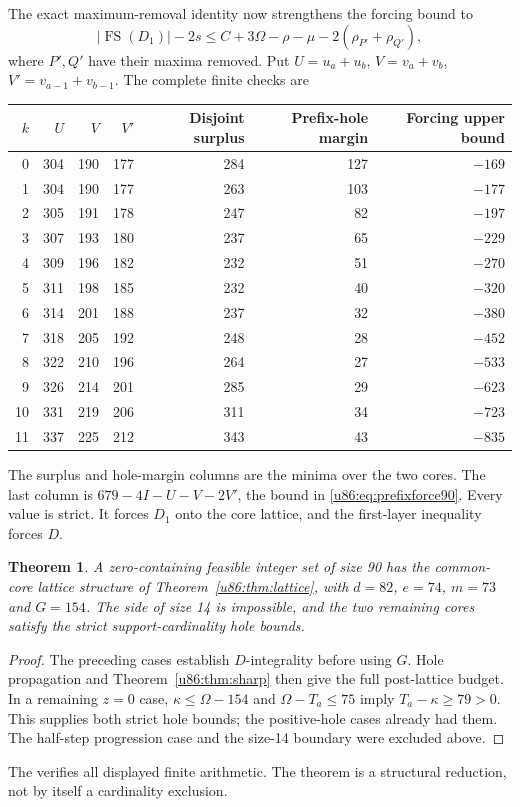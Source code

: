 \documentclass[11pt,a4paper]{article}
\newtheorem{theorem}{Theorem}[section]
\theoremstyle{remark}
\newcommand{\FS}{\operatorname{FS}}
\begin{document}
The exact maximum-removal identity now strengthens the forcing bound to
\begin{equation}\label{u86:eq:prefixforce90}
 |\FS(D_1)|-2s
 \le C+3\Omega-\rho-\mu-2(\rho_{P'}+\rho_{Q'}),
\end{equation}
where $P',Q'$ have their maxima removed. Put
$U=u_a+u_b$, $V=v_a+v_b$, $V'=v_{a-1}+v_{b-1}$.
The complete finite checks are
\begin{center}\small
\begin{tabular}{r|rrrrrr}
\toprule
$k$&$U$&$V$&$V'$&Disjoint surplus&Prefix-hole margin&Forcing upper bound\\\midrule
0&304&190&177&284&127&$-169$\\
1&304&190&177&263&103&$-177$\\
2&305&191&178&247&82&$-197$\\
3&307&193&180&237&65&$-229$\\
4&309&196&182&232&51&$-270$\\
5&311&198&185&232&40&$-320$\\
6&314&201&188&237&32&$-380$\\
7&318&205&192&248&28&$-452$\\
8&322&210&196&264&27&$-533$\\
9&326&214&201&285&29&$-623$\\
10&331&219&206&311&34&$-723$\\
11&337&225&212&343&43&$-835$\\\bottomrule
\end{tabular}
\end{center}
The surplus and hole-margin columns are the minima over the two cores.
The last column is $679-4I-U-V-2V'$, the bound in
\eqref{u86:eq:prefixforce90}. Every value is strict. It forces $D_1$ onto
the core lattice, and the first-layer inequality forces $D$.

\begin{theorem}\label{u86:thm:lattice90}
A zero-containing feasible integer set of size 90 has the common-core
lattice structure of Theorem~\ref{u86:thm:lattice}, with $d=82$, $e=74$,
$m=73$ and $G=154$. The side of size 14 is impossible, and the two
remaining cores satisfy the strict support-cardinality hole bounds.
\end{theorem}
\begin{proof}
The preceding cases establish $D$-integrality before using $G$.
Hole propagation and Theorem~\ref{u86:thm:sharp} then give the full
post-lattice budget. In a remaining $z=0$ case,
$\kappa\le\Omega-154$ and $\Omega-T_a\le75$ imply
$T_a-\kappa\ge79>0$. This supplies both strict hole bounds; the
positive-hole cases already had them. The half-step progression case
and the size-14 boundary were excluded above.
\end{proof}
The  verifies all displayed
finite arithmetic. The theorem is a structural reduction, not by itself
a cardinality exclusion.
\end{document}
